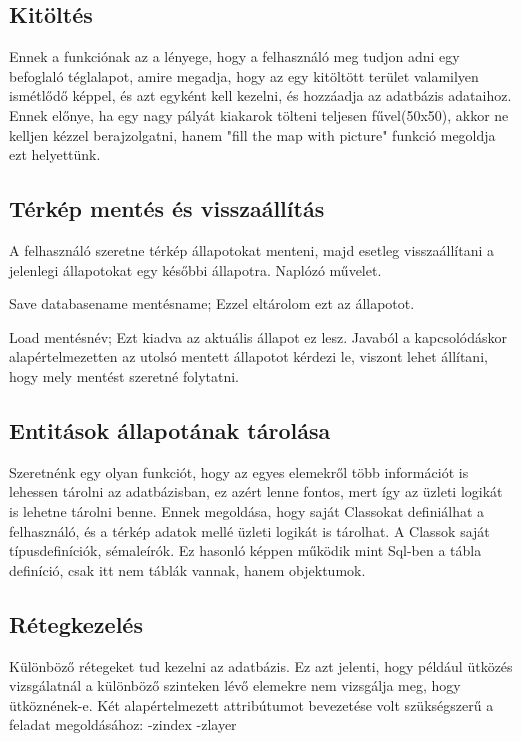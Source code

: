 \begin{sql}
\subsection{Kitöltés}

Ennek a funkciónak az a lényege, hogy a felhasználó meg tudjon adni egy befoglaló téglalapot, amire megadja, hogy az egy kitöltött terület valamilyen ismétlődő képpel, és azt egyként kell kezelni, és hozzáadja az adatbázis adataihoz. Ennek előnye, ha egy nagy pályát kiakarok tölteni teljesen fűvel(50x50), akkor ne kelljen kézzel berajzolgatni, hanem "fill the map with picture" funkció megoldja ezt helyettünk.

\subsection{Térkép mentés és visszaállítás}

A felhasználó szeretne térkép állapotokat menteni, majd esetleg visszaállítani a jelenlegi állapotokat egy későbbi állapotra. Naplózó művelet.

Save databasename mentésname;
Ezzel eltárolom ezt az állapotot.

Load mentésnév;
Ezt kiadva az aktuális állapot ez lesz. Javaból a kapcsolódáskor alapértelmezetten az utolsó mentett állapotot kérdezi le, viszont lehet állítani, hogy mely mentést szeretné folytatni.

\subsection{Entitások állapotának tárolása}

Szeretnénk egy olyan funkciót, hogy az egyes elemekről több információt is lehessen tárolni az adatbázisban, ez azért lenne fontos, mert így az üzleti logikát is lehetne tárolni benne. Ennek megoldása, hogy saját Classokat definiálhat a felhasználó, és a térkép adatok mellé üzleti logikát is tárolhat. A Classok saját típusdefiníciók, sémaleírók. Ez hasonló képpen működik mint Sql-ben a tábla definíció, csak itt nem táblák vannak, hanem objektumok.

\subsection{Rétegkezelés}

Különböző rétegeket tud kezelni az adatbázis. Ez azt jelenti, hogy például ütközés vizsgálatnál a különböző szinteken lévő elemekre nem vizsgálja meg, hogy ütköznének-e. Két alapértelmezett attribútumot bevezetése volt szükségszerű a feladat megoldásához:
-zindex
-zlayer


\end{sql}

